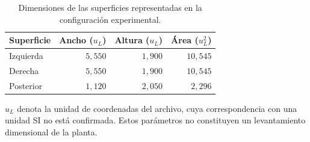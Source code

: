 \begin{table}[htbp]
\centering
\caption{Dimensiones de las superficies representadas en la configuración experimental.}
\label{tab:res_geometria}
\small
\setlength{\tabcolsep}{5pt}
\begin{tabular}{lrrr}
\toprule
Superficie & Ancho ($u_L$) & Altura ($u_L$) & Área ($u_L^2$) \\
\midrule
Izquierda & $5{,}550$ & $1{,}900$ & $10{,}545$ \\
Derecha & $5{,}550$ & $1{,}900$ & $10{,}545$ \\
Posterior & $1{,}120$ & $2{,}050$ & $2{,}296$ \\
\bottomrule
\end{tabular}
\par\vspace{3pt}
\begin{minipage}{0.98\textwidth}\footnotesize
$u_L$ denota la unidad de coordenadas del archivo, cuya correspondencia con una unidad SI no está confirmada. Estos parámetros no constituyen un levantamiento dimensional de la planta.
\end{minipage}
\end{table}
